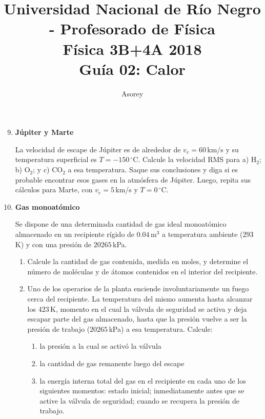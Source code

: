 \documentclass[a4paper,12pt]{article}
\begin{document}
\title{
{\normalsize{Universidad Nacional de Río Negro - Profesorado de Física}}\\
Física 3B+4A  2018 \\ Guía 02: Calor}
\author{Asorey}
\maketitle

\begin{enumerate}
	\setcounter{enumi}{8}      %

	\item {\bf{Júpiter y Marte}}

		La velocidad de escape de Júpiter es de alrededor de $v_e=60$\,km/s y
		su temperatura superficial es $T=-150\,^\circ$C. Calcule la velocidad
		RMS para a) H$_2$; b) O$_2$; y c) CO$_2$ a esa temperatura. Saque sus
		conclusiones y diga si es probable encontrar esos gases en la atmósfera
		de Júpiter. Luego, repita sus cálculos para Marte, con $v_e=5$\,km/s y
		$T=0\,^\circ$C.   

	\item {\bf{Gas monoatómico}}
	
		Se dispone de una determinada cantidad de gas ideal monoatómico
		almacenado en un recipiente rígido de $0.04$\,m$^3$ a temperatura
		ambiente ($293$\,K) y con una presión de $20265$\,kPa.
		\begin{enumerate}
			\item Calcule la cantidad de gas contenida, medida en moles, y
				determine el número de moléculas y de átomos contenidos en el
				interior del recipiente.
			\item Uno de los operarios de la planta enciende involuntariamente
				un fuego cerca del recipiente. La temperatura del mismo aumenta
				hasta alcanzar los $423$\,K, momento en el cual la válvula de
				seguridad se activa y deja escapar parte del gas almacenado,
				hasta que la presión vuelve a ser la presión de trabajo
				($20265$\,kPa) a esa temperatura. Calcule: 
				\begin{enumerate}
					\item la presión a la cual se activó la válvula
					\item la cantidad de gas remanente luego del escape
					\item la energía interna total del gas en el recipiente en
						cada uno de los siguientes momentos: estado inicial;
						inmediatamente antes que se active la válvula de
						seguridad; cuando se recupera la presión de trabajo.
				\end{enumerate}
		\end{enumerate}


\end{enumerate}
\end{document}
